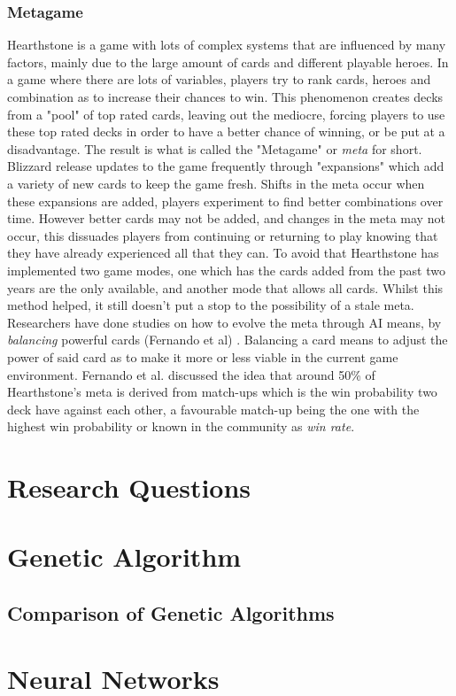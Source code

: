 \documentclass{report}
\begin{document}
	\subsubsection{Metagame}
	Hearthstone is a game with lots of complex systems that are influenced by many factors, mainly due to the large amount of cards and different playable heroes. In a game where there are lots of variables, players try to rank cards, heroes and combination as to increase their chances to win. This phenomenon creates decks from a "pool" of top rated cards, leaving out the mediocre, forcing players to use these top rated decks in order to have a better chance of winning, or be put at a disadvantage. The result is what is called the "Metagame" or {\it{meta}} for short. Blizzard release updates to the game frequently through "expansions" which add a variety of new cards to keep the game fresh. Shifts in the meta occur when these expansions are added, players experiment to find better combinations over time. However better cards may not be added, and changes in the meta may not occur, this dissuades players from continuing or returning to play knowing that they have already experienced all that they can. To avoid that Hearthstone has implemented two game modes, one which has the cards added from the past two years are the only available, and another mode that allows all cards. Whilst this method helped, it still doesn't put a stop to the possibility of a stale meta. Researchers have done studies on how to evolve the meta through AI means, by {\it{balancing}} powerful cards ({Fernando et al}) \cite{EvolveMeta}. Balancing a card means to adjust the power of said card as to make it more or less viable in the current game environment. Fernando et al. discussed the idea that around 50\% of Hearthstone's meta is derived from match-ups which is the win probability two deck have against each other, a favourable match-up being the one with the highest win probability or known in the community as {\it{win rate}}.  
\section{Research Questions}
\section{Genetic Algorithm}
\subsection{Comparison of Genetic Algorithms}
\section{Neural Networks}
\end{document}
